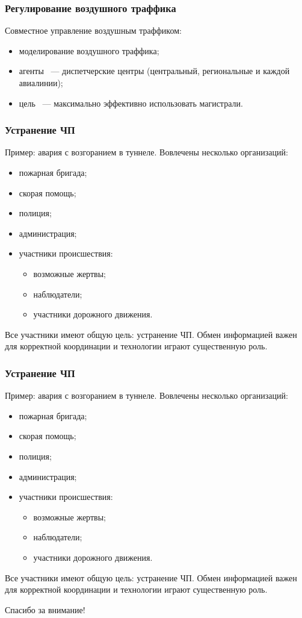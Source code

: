 \documentclass{beamer}
\begin{document}
\begin{frame}
  \frametitle{Регулирование воздушного траффика}
  Совместное управление воздушным траффиком:
  \begin{itemize}
    \item моделирование воздушного траффика;
    \item агенты ~--- диспетчерские центры (центральный, региональные и каждой авиалинии);
    \item цель ~--- максимально эффективно использовать магистрали.
  \end{itemize}
\end{frame}

\begin{frame}
  \frametitle{Устранение ЧП}
  Пример: авария с возгоранием в туннеле. Вовлечены несколько организаций:
  \begin{itemize}
    \item пожарная бригада;
    \item скорая помощь;
    \item полиция;
    \item администрация;
    \item участники происшествия:
      \begin{itemize}
        \item возможные жертвы;
        \item наблюдатели;
        \item участники дорожного движения.
      \end{itemize}
  \end{itemize}

  Все участники имеют общую цель: устранение ЧП. Обмен информацией важен для корректной
  координации и технологии играют существенную роль.
\end{frame}

\begin{frame}
  \frametitle{Устранение ЧП}
  Пример: авария с возгоранием в туннеле. Вовлечены несколько организаций:
  \begin{itemize}
    \item пожарная бригада;
    \item скорая помощь;
    \item полиция;
    \item администрация;
    \item участники происшествия:
      \begin{itemize}
        \item возможные жертвы;
        \item наблюдатели;
        \item участники дорожного движения.
      \end{itemize}
  \end{itemize}

  Все участники имеют общую цель: устранение ЧП. Обмен информацией важен для корректной
  координации и технологии играют существенную роль.
\end{frame}


\begin{frame}{}
\addtocounter{framenumber}{-1}
\begin{center}
\LARGE{Спасибо за внимание!}
\end{center}
\end{frame}
\end{document}
